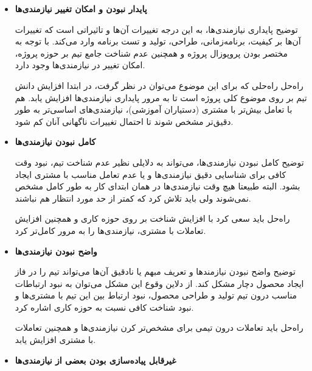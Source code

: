 \begin{itemize}
	
	\item
	\textbf{پایدار نبودن و امکان تغییر نیازمندی‌ها}
	
	
	توضیح \hspace*{1cm}  پایداری نیازمندی‌ها، به این درجه تغییرات آن‌ها و تاثیراتی است که تغییرات آن‌ها بر کیفیت، برنامه‌زمانی، طراحی، تولید و تست برنامه وارد می‌کند. با توجه به مختصر بودن پروپوزال پروژه و همچنین عدم شناخت جامع تیم بر حوزه پروژه،‌ امکان تغییر در نیازمندی‌ها وجود دارد.
	
	
	راه‌حل \hspace*{1cm}  راه‌حلی که برای این موضوع می‌توان در نظر گرفت، در ابتدا افزایش دانش تیم بر روی موضوع کلی پروژه است تا به مرور پایداری نیاز‌مندی‌ها افزایش یابد. هم با تعامل بیش‌تر با مشتری (دستیاران آموزشی)، نیازمندی‌های اساسی‌تر به طور دقیق‌تر مشخص شوند تا احتمال تغییرات ناگهانی آنان کم شود.
	
	\item 
\textbf{	کامل نبودن نیازمندی‌ها}
	
	توضیح \hspace*{1cm}  
	کامل نبودن نیازمندی‌ها،  می‌تواند به دلایلی نظیر عدم شناخت تیم، نبود وقت‌ کافی برای شناسایی دقیق نیازمندی‌ها و یا عدم تعامل مناسب با مشتری ایجاد بشود. البته طبیعتا هیچ‌ وقت نیازمندی‌ها در همان ابتدای کار به طور کامل مشخص نمی‌شوند ولی باید تلاش کرد که کمتر از حد مورد انتظار هم نباشند.
	
	راه‌حل \hspace*{1cm}  باید سعی کرد با افزایش شناخت بر روی حوزه کاری و همچنین افزایش تعاملات با مشتری، نیازمندی‌ها را به مرور کامل‌تر کرد.
	
	
	
	\item 
	\textbf{	واضح نبودن نیازمندی‌ها}
	
	
	توضیح \hspace*{1cm}  
واضح نبودن نیازمند‌ها و تعریف مبهم یا نادقیق ‌آن‌ها می‌تواند تیم را در فاز ایجاد محصول دچار مشکل کند. از دلاین وقوع این مشکل می‌توان به نبود ارتباطات مناسب درون تیم تولید و طراحی محصول، نبود ارتباط بین این تیم با مشتری‌ها و نبود شناخت کافی نسبت به حوزه کاری اشاره کرد.
	
	راه‌حل \hspace*{1cm}  باید تعاملات درون تیمی برای مشخص‌تر کرن نیازمندی‌ها و همچنین تعاملات با مشتری افزایش یابد.
	
	
	\item 
	\textbf{غیرقابل پیاده‌سازی بودن بعضی از نیازمندی‌ها}
	

\end{itemize}
